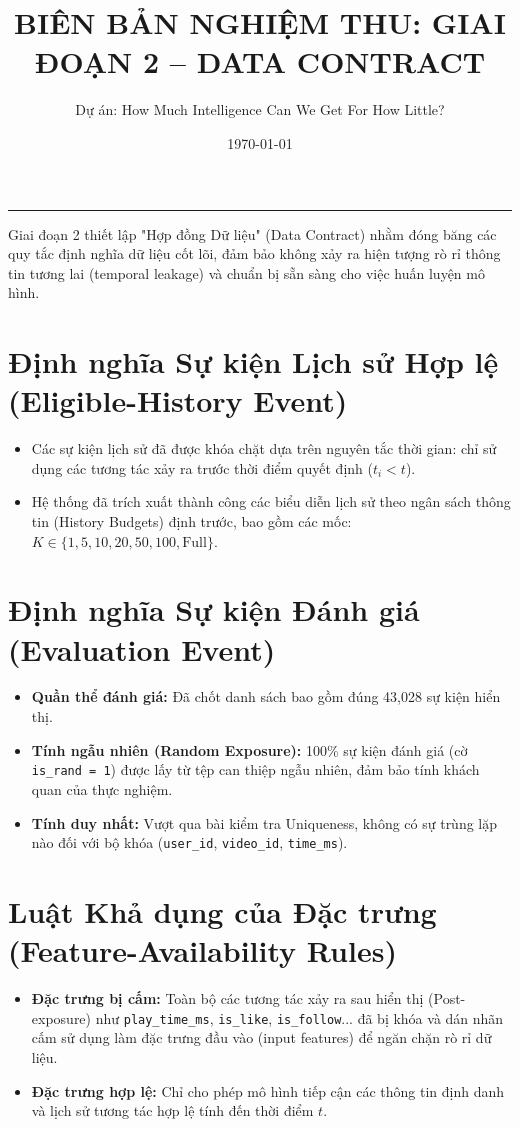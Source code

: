 \documentclass[12pt,a4paper]{article}
\title{\textbf{BIÊN BẢN NGHIỆM THU: GIAI ĐOẠN 2 -- DATA CONTRACT}}
\author{Dự án: How Much Intelligence Can We Get For How Little?}
\date{\today}
\begin{document}
\maketitle
\hrule
\vspace{15pt}

\noindent Giai đoạn 2 thiết lập "Hợp đồng Dữ liệu" (Data Contract) nhằm đóng băng các quy tắc định nghĩa dữ liệu cốt lõi, đảm bảo không xảy ra hiện tượng rò rỉ thông tin tương lai (temporal leakage) và chuẩn bị sẵn sàng cho việc huấn luyện mô hình.

\section{Định nghĩa Sự kiện Lịch sử Hợp lệ (Eligible-History Event)}
\begin{itemize}
    \item Các sự kiện lịch sử đã được khóa chặt dựa trên nguyên tắc thời gian: chỉ sử dụng các tương tác xảy ra trước thời điểm quyết định ($t_i < t$).
    \item Hệ thống đã trích xuất thành công các biểu diễn lịch sử theo ngân sách thông tin (History Budgets) định trước, bao gồm các mốc: $K \in \{1, 5, 10, 20, 50, 100, \text{Full}\}$.
\end{itemize}

\section{Định nghĩa Sự kiện Đánh giá (Evaluation Event)}
\begin{itemize}
    \item \textbf{Quần thể đánh giá:} Đã chốt danh sách bao gồm đúng 43,028 sự kiện hiển thị.
    \item \textbf{Tính ngẫu nhiên (Random Exposure):} 100\% sự kiện đánh giá (cờ \texttt{is\_rand = 1}) được lấy từ tệp can thiệp ngẫu nhiên, đảm bảo tính khách quan của thực nghiệm.
    \item \textbf{Tính duy nhất:} Vượt qua bài kiểm tra Uniqueness, không có sự trùng lặp nào đối với bộ khóa (\texttt{user\_id}, \texttt{video\_id}, \texttt{time\_ms}).
\end{itemize}

\section{Luật Khả dụng của Đặc trưng (Feature-Availability Rules)}
\begin{itemize}
    \item \textbf{Đặc trưng bị cấm:} Toàn bộ các tương tác xảy ra sau hiển thị (Post-exposure) như \texttt{play\_time\_ms}, \texttt{is\_like}, \texttt{is\_follow}... đã bị khóa và dán nhãn cấm sử dụng làm đặc trưng đầu vào (input features) để ngăn chặn rò rỉ dữ liệu.
    \item \textbf{Đặc trưng hợp lệ:} Chỉ cho phép mô hình tiếp cận các thông tin định danh và lịch sử tương tác hợp lệ tính đến thời điểm $t$.
\end{itemize}
\end{document}

